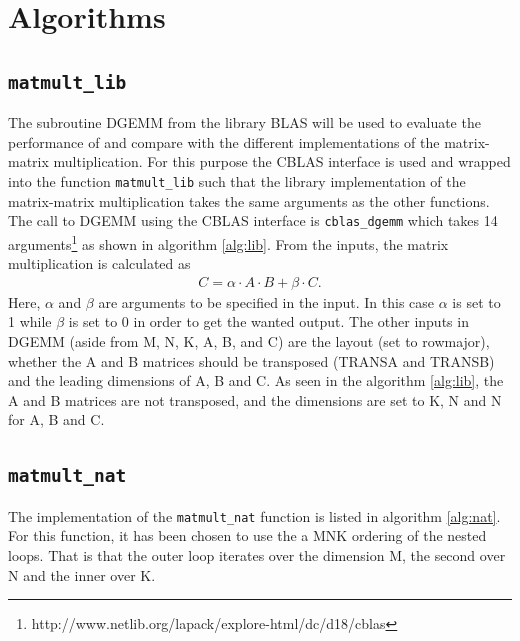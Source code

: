 


\section{Algorithms}
\subsection{\texttt{matmult\_lib}} %
The subroutine DGEMM from the library BLAS will be used to evaluate the performance of and compare with the different implementations of the matrix-matrix multiplication. For this purpose the CBLAS interface is used and wrapped into the function \texttt{matmult\_lib} such that the library implementation of the matrix-matrix multiplication takes the same arguments as the other functions.  The call to DGEMM using the CBLAS interface is \texttt{cblas\_dgemm} which takes 14 arguments\footnote{http://www.netlib.org/lapack/explore-html/dc/d18/cblas} as shown in algorithm \ref{alg:lib}. From the inputs, the matrix multiplication is calculated as
\begin{align*}
    C = \alpha \cdot A \cdot B + \beta \cdot C.
\end{align*}
Here, $\alpha$ and $\beta$ are arguments to be specified in the input. In this case $\alpha$ is set to 1 while $\beta$ is set to 0 in order to get the wanted output. The other inputs in DGEMM (aside from M, N, K, A, B, and C) are the layout (set to rowmajor), whether the A and B matrices should be transposed (TRANSA and TRANSB) and the leading dimensions of A, B and C. As seen in the algorithm \ref{alg:lib}, the A and B matrices are not transposed, and the dimensions are set to K, N and N for A, B and C. 


\subsection{\texttt{matmult\_nat}} %
The implementation of the \texttt{matmult\_nat} function is listed in algorithm \ref{alg:nat}. For this function, it has been chosen to use the a MNK ordering of the nested loops. That is that the outer loop iterates over the dimension M, the second over N and the inner over K. 


